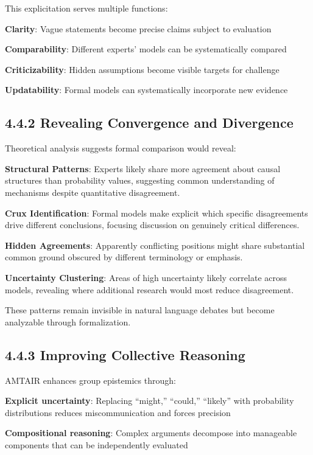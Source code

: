 \documentclass[
  11pt,
  letterpaper,
  openany]{book}
\begin{document}
This explicitation serves multiple functions:

\textbf{Clarity}: Vague statements become precise claims subject to
evaluation

\textbf{Comparability}: Different experts' models can be systematically
compared

\textbf{Criticizability}: Hidden assumptions become visible targets for
challenge

\textbf{Updatability}: Formal models can systematically incorporate new
evidence

\subsection{4.4.2 Revealing Convergence and
Divergence}\label{sec-convergence-divergence}

Theoretical analysis suggests formal comparison would reveal:

\textbf{Structural Patterns}: Experts likely share more agreement about
causal structures than probability values, suggesting common
understanding of mechanisms despite quantitative disagreement.

\textbf{Crux Identification}: Formal models make explicit which specific
disagreements drive different conclusions, focusing discussion on
genuinely critical differences.

\textbf{Hidden Agreements}: Apparently conflicting positions might share
substantial common ground obscured by different terminology or emphasis.

\textbf{Uncertainty Clustering}: Areas of high uncertainty likely
correlate across models, revealing where additional research would most
reduce disagreement.

These patterns remain invisible in natural language debates but become
analyzable through formalization.

\subsection{4.4.3 Improving Collective
Reasoning}\label{sec-collective-reasoning}

AMTAIR enhances group epistemics through:

\textbf{Explicit uncertainty}: Replacing ``might,'' ``could,''
``likely'' with probability distributions reduces miscommunication and
forces precision

\textbf{Compositional reasoning}: Complex arguments decompose into
manageable components that can be independently evaluated
\end{document}
